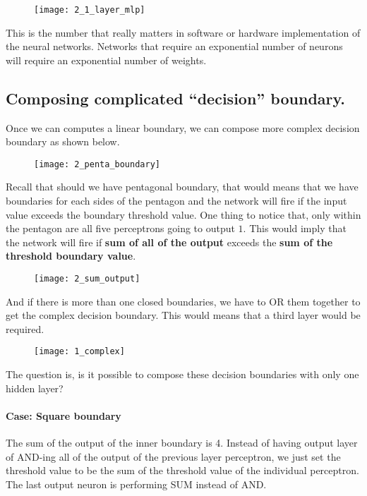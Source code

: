 \begin{figure}[H]
	\centering
	\texttt{[image: 2\_1\_layer\_mlp]}
\end{figure}

This is the number that really matters in software or hardware implementation of the neural networks. Networks that require an exponential number of neurons will require an exponential number of weights.

\subsection{Composing complicated ``decision'' boundary.}
Once we can computes a linear boundary, we can compose more complex decision boundary as shown below.

\begin{figure}[H]
	\centering
	\texttt{[image: 2\_penta\_boundary]}
\end{figure}

\hfill\break
Recall that should we have pentagonal boundary, that would means that we have boundaries for each sides of the pentagon and the network will fire if the input value exceeds the boundary threshold value. One thing to notice that, only within the pentagon are all five perceptrons going to output $1$. This would imply that the network will fire if \textbf{sum of all of the output} exceeds the \textbf{sum of the threshold boundary value}.

\begin{figure}[H]
	\centering
	\texttt{[image: 2\_sum\_output]}
\end{figure}

And if there is more than one closed boundaries, we have to OR them together to get the complex decision boundary. This would means that a third layer would be required.

\begin{figure}[H]
	\centering
	\texttt{[image: 1\_complex]}
\end{figure}

The question is, is it possible to compose these decision boundaries with only one hidden layer?

\paragraph{Case: Square boundary}
The sum of the output of the inner boundary is 4. Instead of having output layer of AND-ing all of the output of the previous layer perceptron, we just set the threshold value to be the sum of the threshold value of the individual perceptron. The last output neuron is performing SUM instead of AND.

